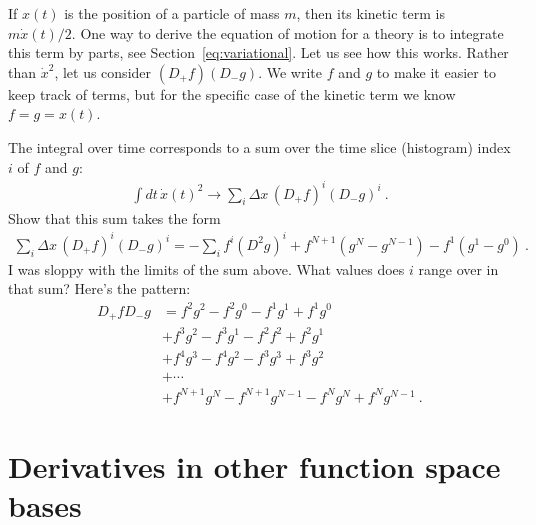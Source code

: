 \documentclass[12pt, oneside]{report}    %
\let\oldsection\section
\def\section{%
  \setcounter{sidenote}{1}%
  \oldsection
}
\begin{document}
\begin{exercise} \label{ex:integrate:kinetic:term:by:parts}
If $x(t)$ is the position of a particle of mass $m$, then its kinetic term is $m\dot x(t)/2$. One way to derive the equation of motion for a theory is to integrate this term by parts, see Section~\ref{eq:variational}. Let us see how this works. Rather than $\dot x^2$, let us consider $(D_+f)(D_-g)$. We write $f$ and $g$ to make it easier to keep track of terms, but for the specific case of the kinetic term we know $f=g=x(t)$. 

The integral over time corresponds to a sum over the time slice (histogram) index $i$ of $f$ and $g$:
\begin{align}
    \int dt\, \dot x(t)^2 \to \sum_i \Delta x \, (D_+f)^i(D_-g)^i \ .
\end{align}
Show that this sum takes the form
\begin{align}
    \sum_i \Delta x \, (D_+f)^i(D_-g)^i 
    = -\sum_i f^i (D^2 g)^i 
    + f^{N+1}(g^N-g^{N-1})
    - f^1(g^1 - g^0) \ .
\end{align}
I was sloppy with the limits of the sum above. What values does $i$ range over in that sum?
Here's the pattern:
\begin{align}
    D_+fD_-g &= 
    f^2g^2 - f^2g^0 - f^1 g^1 + f^1 g^0\\
    &+ f^3 g^2 - f^3 g^1 - f^2 f^2 + f^2 g^1 \\
    &+ f^4 g^3 - f^4 g^2 - f^3 g^3 + f^3 g^2 \\
    &+ \cdots \\
    & + f^{N+1} g^N - f^{N+1} g^{N-1} - f^N g^N + f^N g^{N-1}  \ .
\end{align}
\end{exercise}

\section{Derivatives in other function space bases}
\label{sec:derivatives}

\end{document}
